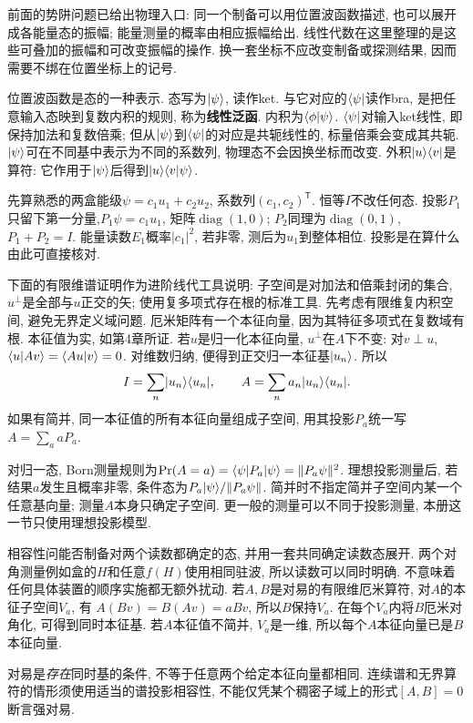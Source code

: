 
前面的势阱问题已给出物理入口: 同一个制备可以用位置波函数描述, 也可以展开成各能量态的振幅; 能量测量的概率由相应振幅给出. 线性代数在这里整理的是这些可叠加的振幅和可改变振幅的操作. 换一套坐标不应改变制备或探测结果, 因而需要不绑在位置坐标上的记号.

位置波函数是态的一种表示. 态写为$\lvert \psi\rangle$, 读作ket. 与它对应的$\langle \psi\rvert$读作bra, 是把任意输入态映到复数内积的规则, 称为\textbf{线性泛函}. 内积为$\langle \phi\vert \psi\rangle$. $\langle \psi\rvert$对输入ket线性, 即保持加法和复数倍乘; 但从$\lvert \psi\rangle$到$\langle \psi\rvert$的对应是共轭线性的, 标量倍乘会变成其共轭. $\lvert \psi\rangle$可在不同基中表示为不同的系数列, 物理态不会因换坐标而改变. 外积$\lvert u\rangle\langle v\rvert$是算符: 它作用于$\lvert \psi\rangle$后得到$\lvert u\rangle\langle v\vert \psi\rangle$.

先算熟悉的两盒能级$\psi=c_1u_1+c_2u_2$, 系数列$(c_1,c_2)^{\mathsf T}$. 恒等$I$不改任何态. 投影$P_1$只留下第一分量,$P_1\psi=c_1u_1$, 矩阵$\operatorname{diag}(1,0)$; $P_2$同理为$\operatorname{diag}(0,1)$, $P_1+P_2=I$. 能量读数$E_1$概率$|c_1|^2$, 若非零, 测后为$u_1$到整体相位. 投影是在算什么由此可直接核对.

下面的有限维谱证明作为进阶线代工具说明: 子空间是对加法和倍乘封闭的集合,$u^\perp$是全部与$u$正交的矢; 使用复多项式存在根的标准工具. 先考虑有限维复内积空间, 避免无界定义域问题. 厄米矩阵有一个本征向量, 因为其特征多项式在复数域有根. 本征值为实, 如第4章所证. 若$u$是归一化本征向量, $u^\perp$在$A$下不变: 对$v\perp u$, $\langle u\vert Av\rangle=\langle Au\vert v\rangle=0$. 对维数归纳, 便得到正交归一本征基$\lvert u_n\rangle$. 所以
\[
I=\sum_n\lvert u_n\rangle\langle u_n\rvert,\qquad
A=\sum_n a_n\lvert u_n\rangle\langle u_n\rvert.
\]
如果有简并, 同一本征值的所有本征向量组成子空间, 用其投影$P_a$统一写$A=\sum_a aP_a$.

对归一态, Born测量规则为$\Pr(A=a)=\langle \psi\rvert P_a\lvert \psi\rangle=\|P_a\psi\|^2$. 理想投影测量后, 若结果$a$发生且概率非零, 条件态为$P_a\lvert \psi\rangle/\|P_a\psi\|$. 简并时不指定简并子空间内某一个任意基向量; 测量$A$本身只确定子空间. 更一般的测量可以不同于投影测量, 本册这一节只使用理想投影模型.

相容性问能否制备对两个读数都确定的态, 并用一套共同确定读数态展开. 两个对角测量例如盒的$H$和任意$f(H)$使用相同驻波, 所以读数可以同时明确. 不意味着任何具体装置的顺序实施都无额外扰动. 若$A,B$是对易的有限维厄米算符, 对$A$的本征子空间$V_a$, 有 $A(Bv)=B(Av)=aBv$, 所以$B$保持$V_a$. 在每个$V_a$内将$B$厄米对角化, 可得到同时本征基. 若$A$本征值不简并, $V_a$是一维, 所以每个$A$本征向量已是$B$本征向量.

对易是\emph{存在}同时基的条件, 不等于任意两个给定本征向量都相同. 连续谱和无界算符的情形须使用适当的谱投影相容性, 不能仅凭某个稠密子域上的形式$[A,B]=0$断言强对易.

